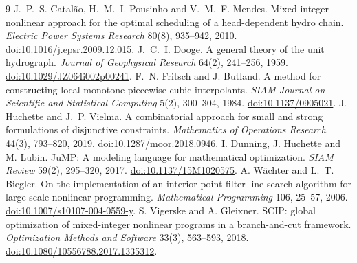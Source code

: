 \documentclass[10pt,a4paper]{article}
\begin{document}
\begin{thebibliography}{9}
J.~P.~S. Catal\~ao, H.~M.~I. Pousinho and V.~M.~F. Mendes.
Mixed-integer nonlinear approach for the optimal scheduling of a
head-dependent hydro chain.
\emph{Electric Power Systems Research} 80(8), 935--942, 2010.
\href{https://doi.org/10.1016/j.epsr.2009.12.015}{doi:10.1016/j.epsr.2009.12.015}.
J.~C.~I. Dooge. A general theory of the unit hydrograph.
\emph{Journal of Geophysical Research} 64(2), 241--256, 1959.
\href{https://doi.org/10.1029/JZ064i002p00241}{doi:10.1029/JZ064i002p00241}.
F.~N. Fritsch and J. Butland.
A method for constructing local monotone piecewise cubic interpolants.
\emph{SIAM Journal on Scientific and Statistical Computing} 5(2), 300--304, 1984.
\href{https://doi.org/10.1137/0905021}{doi:10.1137/0905021}.
J. Huchette and J.~P. Vielma.
A combinatorial approach for small and strong formulations of disjunctive constraints.
\emph{Mathematics of Operations Research} 44(3), 793--820, 2019.
\href{https://doi.org/10.1287/moor.2018.0946}{doi:10.1287/moor.2018.0946}.
I. Dunning, J. Huchette and M. Lubin.
JuMP: A modeling language for mathematical optimization.
\emph{SIAM Review} 59(2), 295--320, 2017.
\href{https://doi.org/10.1137/15M1020575}{doi:10.1137/15M1020575}.
A. W\"achter and L.~T. Biegler.
On the implementation of an interior-point filter line-search algorithm
for large-scale nonlinear programming.
\emph{Mathematical Programming} 106, 25--57, 2006.
\href{https://doi.org/10.1007/s10107-004-0559-y}{doi:10.1007/s10107-004-0559-y}.
S. Vigerske and A. Gleixner.
SCIP: global optimization of mixed-integer nonlinear programs in a branch-and-cut framework.
\emph{Optimization Methods and Software} 33(3), 563--593, 2018.
\href{https://doi.org/10.1080/10556788.2017.1335312}{doi:10.1080/10556788.2017.1335312}.
\end{thebibliography}
\end{document}

